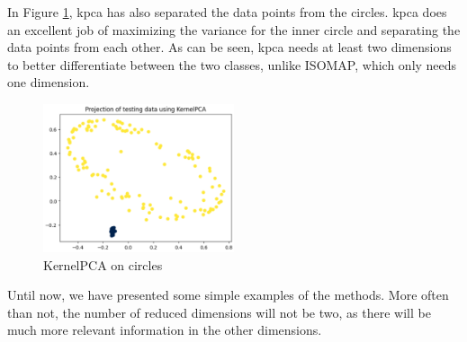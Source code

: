 In Figure \ref{fig:circles-kernelpca}, \gls{kpca} has also separated the data points from the circles. \gls{kpca} does an excellent job of maximizing the variance for the inner circle and separating the data points from each other. As can be seen, \gls{kpca} needs at least two dimensions to better differentiate between the two classes, unlike ISOMAP, which only needs one dimension.
\begin{figure}[htb!]
    \centering
    \includegraphics[width=0.5\textwidth]{figures/theory-example-figures/circles-kernelpca.png}
    \caption{KernelPCA on circles}
    \label{fig:circles-kernelpca}
\end{figure}

Until now, we have presented some simple examples of the methods. More often than not, the number of reduced dimensions will not be two, as there will be much more relevant information in the other dimensions.